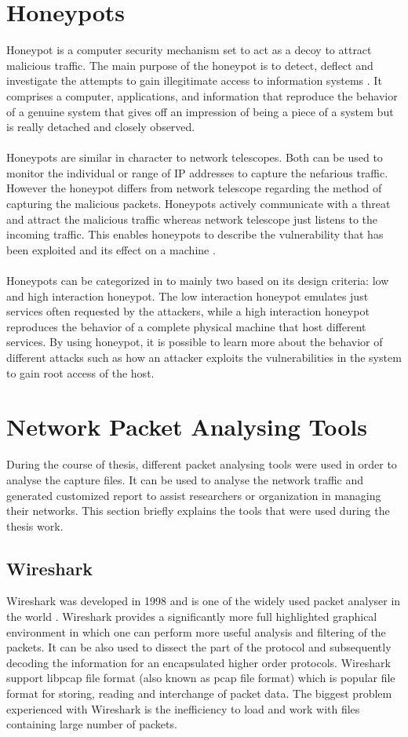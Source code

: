    \section{Honeypots}
    Honeypot is a computer security mechanism set to act as a decoy to attract malicious traffic.
    The main purpose of the honeypot is to detect, deflect and investigate the attempts to gain illegitimate access to information systems \cite{provos2004virtual}.
    It comprises a computer, applications, and information that reproduce the behavior of a genuine system that gives off an impression of being a piece of a system but is really detached and closely observed.\\\\
    Honeypots are similar in character to network telescopes.
    Both can be used to monitor the individual or range of IP addresses to capture the nefarious traffic.
    However the honeypot differs from network telescope regarding the method of capturing the  malicious packets.
    Honeypots actively communicate with a threat and attract the malicious traffic whereas network telescope just listens to the incoming traffic. 
    This enables honeypots to describe  the vulnerability that has been exploited and its effect on a machine \cite{bailey2005data}.\\\\
    Honeypots can be categorized in to mainly two based on its design criteria: low and high interaction honeypot.
    The low interaction honeypot emulates just services often requested by the 
    attackers, while a high interaction honeypot reproduces the behavior of a complete physical machine that host different services.
    By using honeypot, it is possible to learn more about the behavior of  different attacks such as how an attacker exploits the vulnerabilities in the system to  gain root access of the host.
    \section{Network Packet Analysing Tools}
    During the course of thesis, different packet analysing tools were used in order to analyse the capture files.
    It can be used to analyse the network traffic and generated customized report to assist researchers or organization in managing their networks.
    This section briefly explains the tools that were used during the thesis work.
    \subsection{Wireshark}
    Wireshark was developed in 1998 and is one of the widely used packet analyser in the world \cite{wireshark}.
    Wireshark provides a significantly more full highlighted graphical environment in which one can perform more useful analysis and filtering of the packets.
    It can be also used to dissect the part of the protocol and subsequently decoding the information for an encapsulated higher order protocols.
    Wireshark support libpcap file format (also known as pcap file format) which is popular file format for storing, reading and interchange of packet data.
    The biggest problem experienced with Wireshark is the inefficiency to load and work with files containing large number of packets.
